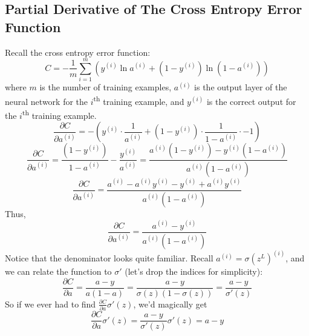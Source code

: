 \documentclass[11pt]{article}
\begin{document}
\subsection{Partial Derivative of The Cross Entropy Error Function}
Recall the cross entropy error function:
\[C = - \frac{1}{m} \sum_{i = 1}^m \left(y^{(i)} \ln a^{(i)} + \left(1 - y^{(i)}\right) \ln \left(1 - a^{(i)}\right)\right)\]
where $m$ is the number of training examples, $a^{(i)}$ is the output layer of the neural network for the $i$\textsuperscript{th} training example, and $y^{(i)}$ is the correct output for the $i$\textsuperscript{th} training example.
\[\frac{\partial C}{\partial a^{(i)}} = -\left(y^{(i)} \cdot \frac{1}{a^{(i)}} + \left(1 - y^{(i)}\right) \cdot \frac{1}{1 - a^{(i)}} \cdot -1\right)\]
\[\frac{\partial C}{\partial a^{(i)}} = \frac{\left(1 - y^{(i)}\right)}{1 - a^{(i)}} - \frac{y^{(i)}}{a^{(i)}} = \frac{a^{(i)}\left(1 - y^{(i)}\right) - y^{(i)}\left(1 - a^{(i)}\right)}{a^{(i)} \left(1 - a^{(i)}\right)}\]
\[\frac{\partial C}{\partial a^{(i)}} = \frac{a^{(i)} - a^{(i)} y^{(i)} - y^{(i)} + a^{(i)} y^{(i)}}{a^{(i)} \left(1 - a^{(i)}\right)}\]
Thus,
\[\frac{\partial C}{\partial a^{(i)}} = \frac{a^{(i)} - y^{(i)}}{a^{(i)} \left(1 - a^{(i)}\right)}\]
Notice that the denominator looks quite familiar. Recall $a^{(i)} = \sigma\left(z^L\right)^{(i)}$, and we can relate the function to $\sigma'$ (let's drop the indices for simplicity):
\[\frac{\partial C}{\partial a} = \frac{a - y}{a (1 - a)} = \frac{a - y}{\sigma(z) \left(1 - \sigma(z)\right)} = \frac{a - y}{\sigma'(z)}\]
So if we ever had to find $\frac{\partial C}{\partial a} \sigma'(z)$, we'd magically get
\[\frac{\partial C}{\partial a} \sigma'(z) = \frac{a - y}{\sigma'(z)} \sigma'(z) = a - y\]
\end{document}

